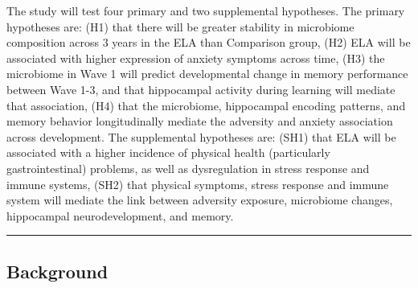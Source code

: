 \documentclass[]{book}
\begin{document}
The study will test four primary and two supplemental hypotheses. The primary hypotheses are: (H1) that there will be greater stability in microbiome composition across 3 years in the ELA than Comparison group, (H2) ELA will be associated with higher expression of anxiety symptoms across time, (H3) the microbiome in Wave 1 will predict developmental change in memory performance between Wave 1-3, and that hippocampal activity during learning will mediate that association, (H4) that the microbiome, hippocampal encoding patterns, and memory behavior longitudinally mediate the adversity and anxiety association across development. The supplemental hypotheses are: (SH1) that ELA will be associated with a higher incidence of physical health (particularly gastrointestinal) problems, as well as dysregulation in stress response and immune systems, (SH2) that physical symptoms, stress response and immune system will mediate the link between adversity exposure, microbiome changes, hippocampal neurodevelopment, and memory.

\begin{center}\rule{0.5\linewidth}{0.5pt}\end{center}

\hypertarget{background}{%
\subsection{Background}\label{background}}
\end{document}
